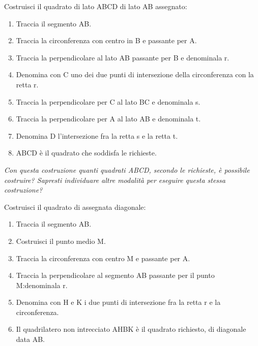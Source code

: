 \begin{procedura}
  Costruisci il quadrato di lato ABCD di lato AB assegnato:
  \begin{enumerate} [nosep]
    \item 
    Traccia il segmento AB.
    \item 
    Traccia la circonferenza con centro in B e passante per A.
    \item 
    Traccia la perpendicolare al lato AB passante per B e denominala r.
    \item 
    Denomina con C uno dei due punti di intersezione della circonferenza con la 
retta r.
    \item 
    Traccia la perpendicolare per C al lato BC e denominala s.
    \item 
    Traccia la perpendicolare per A al lato AB e denominala t.
    \item
    Denomina D l'intersezione fra la retta s e la retta t.
    \item
    ABCD è il quadrato che soddisfa le richieste.
  \end{enumerate}
  \textit{Con questa costruzione quanti quadrati ABCD, secondo le richieste, è 
possibile costruire?
    Sapresti individuare altre modalità per eseguire questa stessa costruzione? 
}
\end{procedura}


\begin{procedura}
  Costruisci il quadrato di assegnata diagonale:
  \begin{enumerate} [nosep]
    \item 
    Traccia il segmento AB.
    \item 
    Costruisci il punto medio M.
    \item 
    Traccia la circonferenza con centro M e passante per A.
    \item 
    Traccia la perpendicolare al segmento AB passante per il punto M:denominala 
r.
    \item 
    Denomina con H e K i due punti di intersezione fra la retta r e la 
circonferenza.
    \item 
    Il quadrilatero non intrecciato AHBK è il quadrato richiesto, di diagonale 
data AB.
  \end{enumerate}
\end{procedura}
% 
% 
% 
